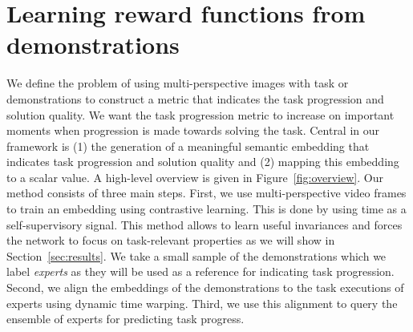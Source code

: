 \documentclass[\home/main.tex]{subfiles}
\begin{document}

\chapter{Learning reward functions from demonstrations}\label{ch:reward_functions}


We define the problem of using multi-perspective images with task or demonstrations to construct a metric that indicates the task progression and solution quality. We want the task progression metric to increase on important moments when progression is made towards solving the task. Central in our framework is (1) the generation of a meaningful semantic embedding that indicates task progression and solution quality and (2) mapping this embedding to a scalar value. A high-level overview is given in Figure~\ref{fig:overview}. Our method consists of three main steps. First, we use multi-perspective video frames to train an embedding using contrastive learning. This is done by using time as a self-supervisory signal. This method allows to learn useful invariances and forces the network to focus on task-relevant properties as we will show in Section~\ref{sec:results}. We take a small sample of the demonstrations which we label \textit{experts} as they will be used as a reference for indicating task progression. Second, we align the embeddings of the demonstrations to the task executions of experts using dynamic time warping. Third, we use this alignment to query the ensemble of experts for predicting task progress.


\end{document}
